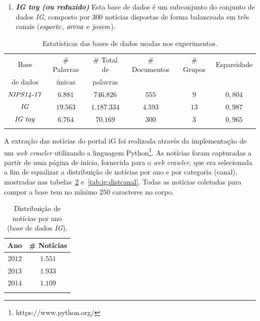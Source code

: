 \documentclass[
    12pt,                %
    oneside,            %
    a4paper,            %
    english,            %
    brazil                %
    ]{abntex2ppgsi}
\begin{document}
\begin{enumerate}
    \item \textbf{\textit{IG toy (ou reduzido)}} Esta base de dados é um subconjunto do conjunto de dados \textit{IG}, composto por $300$ notícias dispostas de forma balanceada em três canais ($\text{\textit{esporte}}$, $\text{\textit{arena}}$ e $\text{\textit{jovem}}$).
\end{enumerate}

\begin{table}[h]
    \centering
    \caption{Estatísticas das bases de dados usadas nos experimentos.}
    \begin{tabular}{cccccc}
        \hline
        Base     & \# Palavras & \# Total de & \# Documentos & \# Grupos & Esparsidade \\
        de dados & únicas      & palavras    &               &           &             \\
        \hline
        $\text{\textit{NIPS14-17}}$ & $6.881$  & $746.826$   & $555$   & $9$  & $0,804$ \\
        $\text{\textit{IG}}$        & $19.563$ & $1.187.334$ & $4.593$ & $13$ & $0,987$ \\
        $\text{\textit{IG toy}}$    & $6.764$  & $70.169$    & $300$   & $3$  & $0,965$ \\
        \hline
        & & & & & \\
        \end{tabular}
    \label{tab:datasetsstatsREAL}
\end{table}

A extração das notícias do portal iG foi realizada através da implementação de um \textit{web crawler} utilizando a linguagem Python\footnote{https://www.python.org/}.
As notícias foram capturadas a partir de uma página de início, fornecida para o \textit{web crawler}, que era selecionada a fim de equalizar a distribuição de notícias por ano e por categoria (canal), mostradas nas tabelas~\ref{tab:ig:distano} e~\ref{tab:ig:distcanal}.
Todas as notícias coletadas para compor a base tem no mínimo $250$ caracteres no corpo.

\begin{table}[h]
\centering
\caption{Distribuição de notícias por ano (base de dados \textit{IG}).}
    \begin{tabular}{cc}
        \hline
        Ano & \# Notícias \\
        \hline
        $2012$ & $1.551$ \\
        $2013$ & $1.933$ \\
        $2014$ & $1.109$ \\
        \hline
        & \\
    \end{tabular}
    \label{tab:ig:distano}
\end{table}
\end{document}

